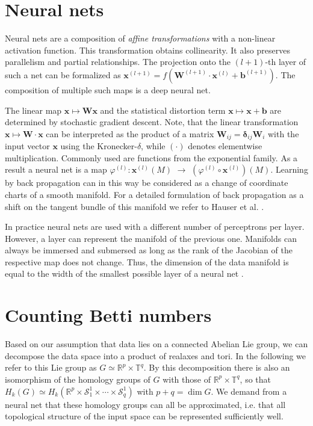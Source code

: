 \documentclass[runningheads,orivec]{llncs}
\begin{document}
\section{Neural nets}
\label{sec:neuralnets}
Neural nets are a composition of \emph{affine transformations} with a non-linear activation function. This transformation obtains collinearity. It also preserves parallelism and partial relationships. The projection onto the $(l+1)$-th layer of such a net can be formalized as $\textbf{x}^{(l+1)} = f(\mathbf{W}^{(l+1)} \cdot \textbf{x}^{(l)}+\textbf{b}^{(l+1)}).$ The composition of multiple such maps is a deep neural net.

The linear map $\textbf{x} \mapsto \mathbf{W} \textbf{x}$ and the statistical distortion term $\textbf{x} \mapsto \textbf{x}+\textbf{b}$ are determined by stochastic gradient descent.  Note, that the linear transformation $\textbf{x} \mapsto \mathbf{W} \cdot \textbf{x}$ can be interpreted as the product of a matrix $\mathbf{W}_{ij} = \mathbf{\delta}_{ij}\mathbf{W}_i$ with the input vector $\textbf{x}$ using the Kronecker-$\delta$, while $(\cdot)$ denotes elementwise multiplication. Commonly used are functions from the exponential family. As a result a neural net is a map $\varphi^{(l)}:\textbf{x}^{(l)}(M)$ $\rightarrow$ $(\varphi^{(l)} \circ \textbf{x}^{(l)})(M)$. Learning by back propagation can in this way be considered as a change of coordinate charts of a smooth manifold. For a detailed formulation of back propagation as a shift on the tangent bundle of this manifold we refer to Hauser et al. \cite{HauserR17}.

In practice neural nets are used with a different number of perceptrons per layer. However, a layer can represent the manifold of the previous one. Manifolds can always be immersed and submersed as long as the rank of the Jacobian of the respective map does not change. Thus, the dimension of the data manifold is equal to the width of the smallest possible layer of a neural net \cite{HauserR17}. 

\section{Counting Betti numbers}
Based on our assumption that data lies on a connected Abelian Lie group, we can decompose the data space into a product of realaxes and tori. In the following we refer to this Lie group as $G \simeq \mathbb{R}^p \times \mathbb{T}^q$. By this decomposition there is also an isomorphism of the homology groups of $G$ with those of $\mathbb{R}^p \times \mathbb{T}^q$, so that $H_k(G) \simeq H_k(\mathbb{R}^p \times \mathcal{S}^{1}_{1}\times\cdots\times\mathcal{S}^{1}_{q})$ with $p+q = \dim G$. We demand from a neural net that these homology groups can all be approximated, i.e. that all topological structure of the input space can be represented sufficiently well. 
\end{document}
